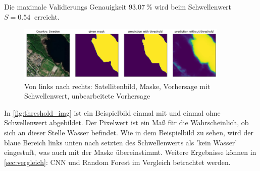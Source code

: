 Die maximale Validierungs Genauigkeit $\SI{93.07}{\percent}$ wird beim Schwellenwert $S = \SI{0.54}{}$ erreicht.

\begin{figure}
    \centering
    \includegraphics[width=0.9\textwidth]{content/img/threshold_img.png}
    \caption{Von links nach rechts: Satellitenbild, Maske, Vorhersage mit Schwellenwert, unbearbeitete Vorhersage \cite{mapbox}\cite{openstreetmap}}
    \label{fig:threshold_img}
\end{figure}
In \autoref{fig:threshold_img} ist ein Beispielbild einmal mit und einmal ohne Schwellenwert abgebildet.
Der Pixelwert ist ein Maß für die Wahrscheinlich, ob sich an dieser Stelle Wasser befindet.
Wie in dem Beispielbild zu sehen, wird der blaue Bereich links unten nach setzten des Schwellenwerts als 'kein Wasser' eingestuft, was auch mit der Maske übereinstimmt.
Weitere Ergebnisse können in \autoref{sec:vergleich}: CNN und Random Forest im Vergleich betrachtet werden.